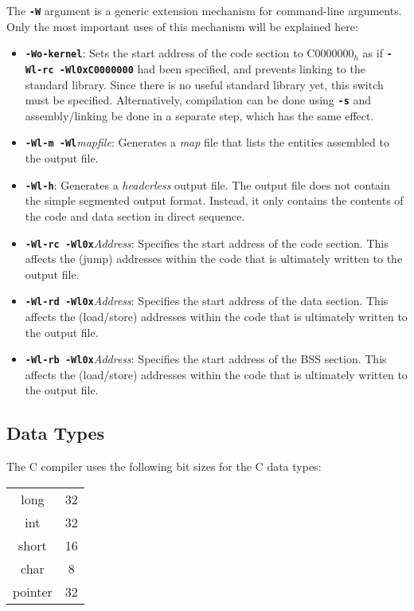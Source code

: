 The {\tt \bf -W} argument is a generic extension mechanism for command-line arguments. Only the most important uses of this mechanism will be explained here:
\begin{itemize}
\item {\tt \bf -Wo-kernel}: Sets the start address of the code section to C0000000$_h$ as if {\tt \bf -Wl-rc -Wl0xC0000000} had been specified, and prevents linking to the standard library. Since there is no useful standard library yet, this switch must be specified. Alternatively, compilation can be done using {\tt \bf -s} and assembly/linking be done in a separate step, which has the same effect.
\item {\tt \bf -Wl-m -Wl}{\it mapfile}: Generates a {\it map} file that lists the entities assembled to the output file.
\item {\tt \bf -Wl-h}: Generates a {\it headerless} output file. The output file does not contain the simple segmented output format. Instead, it only contains the contents of the code and data section in direct sequence.
\item {\tt \bf -Wl-rc -Wl0x}{\it Address}: Specifies the start address of the code section. This affects the (jump) addresses within the code that is ultimately written to the output file.
\item {\tt \bf -Wl-rd -Wl0x}{\it Address}: Specifies the start address of the data section. This affects the (load/store) addresses within the code that is ultimately written to the output file.
\item {\tt \bf -Wl-rb -Wl0x}{\it Address}: Specifies the start address of the BSS section. This affects the (load/store) addresses within the code that is ultimately written to the output file.
\end{itemize}

\subsection{Data Types}

The C compiler uses the following bit sizes for the C data types:

\begin{tabular}{|c|c|}
\hline
long & 32\\
int & 32\\
short & 16\\
char & 8\\
pointer & 32\\
\hline
\end{tabular}

